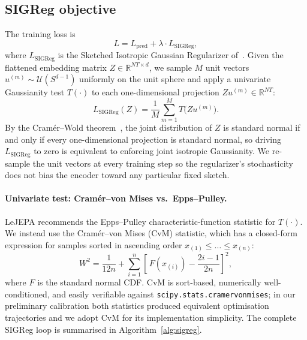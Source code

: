 \subsection{SIGReg objective}
\label{sec:method:sigreg}

The training loss is
\begin{equation}
  L = L_\text{pred} + \lambda \cdot L_\text{SIGReg},
  \label{eq:ltotal}
\end{equation}
where $L_\text{SIGReg}$ is the Sketched Isotropic Gaussian Regularizer
of~\cite{lejepa2025}. Given the flattened embedding matrix
$Z \in \mathbb{R}^{NT \times d}$, we sample $M$ unit vectors
$u^{(m)} \sim \mathcal{U}(S^{d-1})$ uniformly on the unit sphere and apply a
univariate Gaussianity test $T(\cdot)$ to each one-dimensional projection
$Z u^{(m)} \in \mathbb{R}^{NT}$:
\begin{equation}
  L_\text{SIGReg}(Z) = \frac{1}{M}\sum_{m=1}^{M} T\bigl(Z u^{(m)}\bigr).
  \label{eq:sigreg}
\end{equation}
By the Cram\'er--Wold theorem~\cite{cramerwold1936}, the joint distribution
of $Z$ is standard normal if and only if every one-dimensional projection
is standard normal, so driving $L_\text{SIGReg}$ to zero is equivalent to
enforcing joint isotropic Gaussianity. We re-sample the unit vectors at
every training step so the regularizer's stochasticity does not bias the
encoder toward any particular fixed sketch.

\paragraph{Univariate test: Cram\'er--von Mises vs.\ Epps--Pulley.}
LeJEPA recommends the Epps--Pulley characteristic-function statistic for
$T(\cdot)$. We instead use the Cram\'er--von Mises (CvM) statistic, which
has a closed-form expression for samples sorted in ascending order
$x_{(1)} \le \dots \le x_{(n)}$:
\begin{equation}
  W^2 = \frac{1}{12n}
        + \sum_{i=1}^{n}\!\left[\,F(x_{(i)}) - \frac{2i-1}{2n}\right]^2,
  \label{eq:cvm}
\end{equation}
where $F$ is the standard normal CDF. CvM is sort-based, numerically well-conditioned, and easily verifiable against \newline \texttt{scipy.stats.cramervonmises}; in our preliminary calibration both statistics produced equivalent optimisation trajectories and we adopt CvM for its implementation simplicity. The complete SIGReg loop is summarised in Algorithm~\ref{alg:sigreg}.

